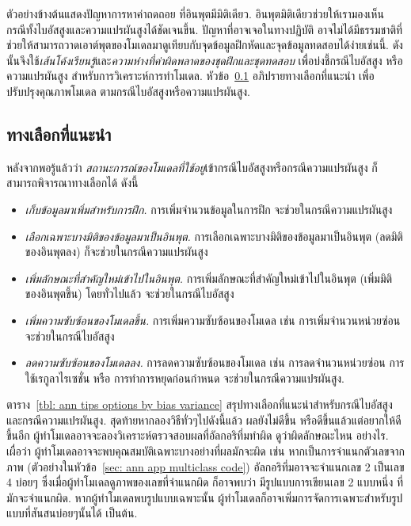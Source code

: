 ตัวอย่างข้างต้นแสดงปัญหาการหาค่าถดถอย ที่อินพุตมีมิติเดียว.
อินพุตมิติเดียวช่วยให้เรามองเห็น กรณีทั้งไบอัสสูงและความแปรผันสูงได้ชัดเจนขึ้น.
ปัญหาที่อาจเจอในทางปฏิบัติ
อาจไม่ได้มีธรรมชาติที่ช่วยให้สามารถวาดเอาต์พุตของโมเดลมาดูเทียบกับจุดข้อมูลฝึกหัดและจุดข้อมูลทดสอบได้ง่ายเช่นนี้.
ดังนั้นจึงใช้\textit{เส้นโค้งเรียนรู้}และ\textit{ความห่างที่ค่าผิดพลาดของชุดฝึกและชุดทดสอบ} เพื่อบ่งชี้กรณีไบอัสสูง หรือความแปรผันสูง สำหรับการวิเคราะห์การทำโมเดล.
หัวข้อ~\ref{sec: ann more suggested options} อภิปรายทางเลือกที่แนะนำ 
เพื่อปรับปรุงคุณภาพโมเดล%
ตามกรณีไบอัสสูงหรือความแปรผันสูง.

\subsection{ทางเลือกที่แนะนำ}
\label{sec: ann more suggested options}

หลังจากพอรู้แล้วว่า \textit{สถานะการณ์ของโมเดลที่ใช้อยู่}เข้ากรณีไบอัสสูงหรือกรณีความแปรผันสูง
ก็สามารถพิจารณาทางเลือกได้ ดังนี้
\begin{itemize}
\item \emph{เก็บข้อมูลมาเพิ่มสำหรับการฝึก.} %
การเพิ่มจำนวนข้อมูลในการฝึก จะช่วยในกรณีความแปรผันสูง
\item \emph{เลือกเฉพาะบางมิติของข้อมูลมาเป็นอินพุต.} %
การเลือกเฉพาะบางมิติของข้อมูลมาเป็นอินพุต (ลดมิติของอินพุตลง) ก็จะช่วยในกรณีความแปรผันสูง
\item \emph{เพิ่มลักษณะที่สำคัญใหม่เข้าไปในอินพุต.} %
การเพิ่มลักษณะที่สำคัญใหม่เข้าไปในอินพุต (เพิ่มมิติของอินพุตขึ้น) โดยทั่วไปแล้ว จะช่วยในกรณีไบอัสสูง
\item \emph{เพิ่มความซับซ้อนของโมเดลขึ้น.} %
การเพิ่มความซับซ้อนของโมเดล เช่น การเพิ่มจำนวนหน่วยซ่อน จะช่วยในกรณีไบอัสสูง
\item \emph{ลดความซับซ้อนของโมเดลลง.} %
การลดความซับซ้อนของโมเดล เช่น การลดจำนวนหน่วยซ่อน การใช้เรกูลาไรเซชั่น หรือ การทำการหยุดก่อนกำหนด จะช่วยในกรณีความแปรผันสูง.
\end{itemize}

ตาราง~\ref{tbl: ann tips options by bias variance} 
สรุปทางเลือกที่แนะนำสำหรับกรณีไบอัสสูงและกรณีความแปรผันสูง.
สุดท้ายหากลองวิธีทั่วๆไปดังนี้แล้ว ผลยังไม่ดีขึ้น หรือดีขึ้นแล้วแต่อยากให้ดีขึ้นอีก
ผู้ทำโมเดลอาจจะลองวิเคราะห์ตรวจสอบผลที่อัลกอริทึ่มทำผิด ดูว่าผิดลักษณะไหน อย่างไร.
เผื่อว่า ผู้ทำโมเดลอาจจะพบคุณสมบัติเฉพาะบางอย่างที่ผลมักจะผิด เช่น หากเป็นการจำแนกตัวเลขจากภาพ (ตัวอย่างในหัวข้อ~\ref{sec: ann app multiclass code}) อัลกอริทึ่มอาจจะจำแนกเลข 2 เป็นเลข 4 บ่อยๆ ซึ่งเมื่อผู้ทำโมเดลดูภาพของเลขที่จำแนกผิด ก็อาจพบว่า มีรูปแบบการเขียนเลข 2 แบบหนึ่ง ที่มักจะจำแนกผิด.
หากผู้ทำโมเดลพบรูปแบบเฉพาะนั้น ผู้ทำโมเดลก็อาจเพิ่มการจัดการเฉพาะสำหรับรูปแบบที่สันสนบ่อยๆนั้นได้ เป็นต้น.

